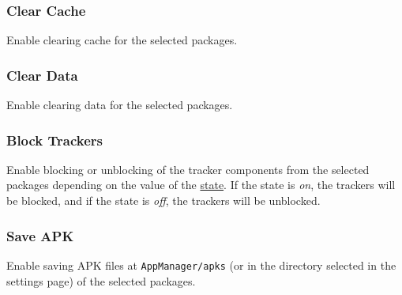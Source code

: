 \subsubsection{Clear Cache} %
Enable clearing cache for the selected packages.

\subsubsection{Clear Data} %
Enable clearing data for the selected packages.

\subsubsection{Block Trackers} %
Enable blocking or unblocking of the tracker components from the selected packages depending on the value of the \hyperref[subsubsec:profile-state]{state}.
If the state is \textit{on}, the trackers will be blocked, and if the state is \textit{off}, the trackers will be unblocked.

\subsubsection{Save APK} %
Enable saving APK files at \texttt{AppManager/apks} (or in the directory selected in the settings page) of the selected packages.
